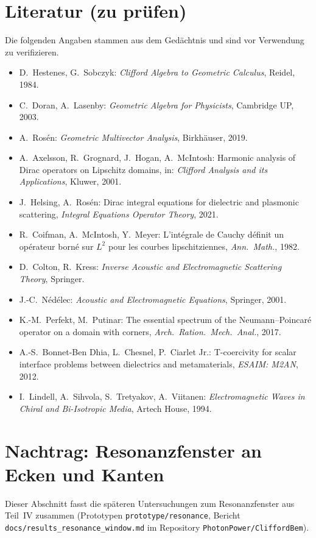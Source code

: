 \documentclass[11pt, a4paper]{article}
\theoremstyle{plain}
\theoremstyle{definition}
\begin{document}
\section*{Literatur (zu prüfen)}
{\small
Die folgenden Angaben stammen aus dem Gedächtnis und sind vor Verwendung zu
verifizieren.
\begin{itemize}[leftmargin=*]
  \item D.~Hestenes, G.~Sobczyk: \emph{Clifford Algebra to Geometric Calculus}, Reidel, 1984.
  \item C.~Doran, A.~Lasenby: \emph{Geometric Algebra for Physicists}, Cambridge UP, 2003.
  \item A.~Rosén: \emph{Geometric Multivector Analysis}, Birkhäuser, 2019.
  \item A.~Axelsson, R.~Grognard, J.~Hogan, A.~McIntosh: Harmonic analysis of
    Dirac operators on Lipschitz domains, in: \emph{Clifford Analysis and its
    Applications}, Kluwer, 2001.
  \item J.~Helsing, A.~Rosén: Dirac integral equations for dielectric and
    plasmonic scattering, \emph{Integral Equations Operator Theory}, 2021.
  \item R.~Coifman, A.~McIntosh, Y.~Meyer: L'intégrale de Cauchy définit un
    opérateur borné sur $L^2$ pour les courbes lipschitziennes, \emph{Ann.\ Math.}, 1982.
  \item D.~Colton, R.~Kress: \emph{Inverse Acoustic and Electromagnetic Scattering Theory}, Springer.
  \item J.-C.~Nédélec: \emph{Acoustic and Electromagnetic Equations}, Springer, 2001.
  \item K.-M.~Perfekt, M.~Putinar: The essential spectrum of the Neumann--Poincaré
    operator on a domain with corners, \emph{Arch.\ Ration.\ Mech.\ Anal.}, 2017.
  \item A.-S.~Bonnet-Ben Dhia, L.~Chesnel, P.~Ciarlet Jr.: T-coercivity for
    scalar interface problems between dielectrics and metamaterials,
    \emph{ESAIM: M2AN}, 2012.
  \item I.~Lindell, A.~Sihvola, S.~Tretyakov, A.~Viitanen: \emph{Electromagnetic
    Waves in Chiral and Bi-Isotropic Media}, Artech House, 1994.
\end{itemize}}


\section{Nachtrag: Resonanzfenster an Ecken und Kanten}\label{sec:fenster}
Dieser Abschnitt fasst die späteren Untersuchungen zum Resonanzfenster aus Teil~IV zusammen
(Prototypen \texttt{prototype/resonance}, Bericht \texttt{docs/results\_resonance\_window.md} im Repository
\texttt{PhotonPower/CliffordBem}).
\end{document}
